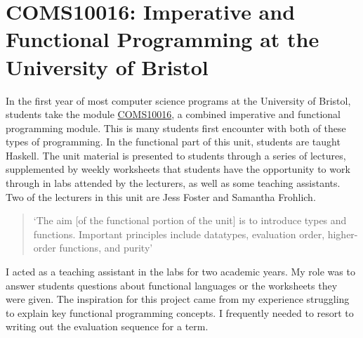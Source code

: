
\section{COMS10016: Imperative and Functional Programming at the University of Bristol}
\label{COMS10016}
In the first year of most computer science programs at the University of Bristol, students take the module \href{https://www.bristol.ac.uk/unit-programme-catalogue/UnitDetails.jsa?unitCode=COMS10016}{COMS10016}, a combined imperative and functional programming module. This is many students first encounter with both of these types of programming. In the functional part of this unit, students are taught Haskell. The unit material is presented to students through a series of lectures, supplemented by weekly worksheets that students have the opportunity to work through in labs attended by the lecturers, as well as some teaching assistants. Two of the lecturers in this unit are Jess Foster and Samantha Frohlich. 

\begin{quote}
`The aim [of the functional portion of the unit] is to introduce types and functions. Important principles include datatypes, evaluation order, higher-order functions, and purity' \cite{COMS10016}
\end{quote}

\noindent I acted as a teaching assistant in the labs for two academic years. My role was to answer students questions about functional languages or the worksheets they were given. The inspiration for this project came from my experience struggling to explain key functional programming concepts. I frequently needed to resort to writing out the evaluation sequence for a term.